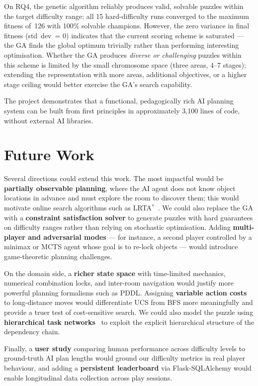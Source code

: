 \documentclass[12pt, a4paper]{report}
\begin{document}
On RQ4, the genetic algorithm reliably produces valid, solvable puzzles within the target difficulty range: all 15 hard-difficulty runs converged to the maximum fitness of~126 with 100\% solvable champions.  However, the zero variance in final fitness (std~dev~= 0) indicates that the current scoring scheme is saturated --- the GA finds the global optimum trivially rather than performing interesting optimisation.  Whether the GA produces \emph{diverse or challenging} puzzles within this scheme is limited by the small chromosome space (three areas, 4--7 stages); extending the representation with more areas, additional objectives, or a higher stage ceiling would better exercise the GA's search capability.

The project demonstrates that a functional, pedagogically rich AI planning
system can be built from first principles in approximately 3,100 lines of
code, without external AI libraries.

\section{Future Work}

Several directions could extend this work.  The most impactful would be \textbf{partially observable planning}, where the AI agent does not know object locations in advance and must explore the room to discover them; this would motivate online search algorithms such as LRTA$^{\ast}$~\cite{korf1990real}.  We could also replace the GA with a \textbf{constraint satisfaction solver} to generate puzzles with hard guarantees on difficulty ranges rather than relying on stochastic optimisation.  Adding \textbf{multi-player and adversarial modes} --- for instance, a second player controlled by a minimax or MCTS agent whose goal is to re-lock objects --- would introduce game-theoretic planning challenges.

On the domain side, a \textbf{richer state space} with time-limited mechanics, numerical combination locks, and inter-room navigation would justify more powerful planning formalisms such as PDDL.  Assigning \textbf{variable action costs} to long-distance moves would differentiate UCS from BFS more meaningfully and provide a truer test of cost-sensitive search.  We could also model the puzzle using \textbf{hierarchical task networks}~\cite{nau2003shop2} to exploit the explicit hierarchical structure of the dependency chain.

Finally, a \textbf{user study} comparing human performance across difficulty levels to ground-truth AI plan lengths would ground our difficulty metrics in real player behaviour, and adding a \textbf{persistent leaderboard} via Flask-SQLAlchemy would enable longitudinal data collection across play sessions.
\end{document}
